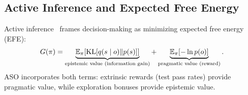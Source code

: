 \subsection{Active Inference and Expected Free Energy}

Active inference~\cite{friston2017active} frames decision-making as minimizing
expected free energy (EFE):
\begin{equation}
    G(\pi) = \underbrace{\mathbb{E}_\pi[\operatorname{KL}[q(s \mid o) \| p(s)]]}_{\text{epistemic value (information gain)}}
           + \underbrace{\mathbb{E}_\pi[-\ln p(o)]}_{\text{pragmatic value (reward)}}.
\end{equation}
ASO incorporates both terms: extrinsic rewards (test pass rates) provide
pragmatic value, while exploration bonuses provide epistemic value.

